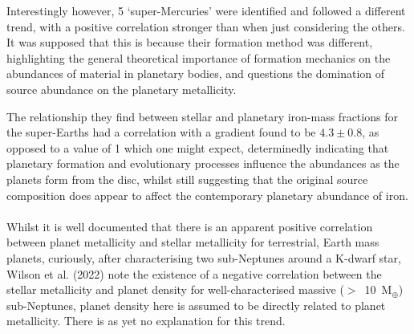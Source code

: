 \documentclass[a4paper,twocolumn,12pt]{article}
\begin{document}
Interestingly however, 
5 `super-Mercuries' were identified and followed a different trend, with a positive correlation stronger than when just considering the others. It was supposed that this is because their formation method was different, highlighting the general theoretical importance of formation mechanics on the abundances of material in planetary bodies, and questions the domination of source abundance on the planetary metallicity.

The relationship they find between stellar and planetary iron-mass fractions for the super-Earths had a correlation with a gradient found to be $4.3\pm0.8$, as opposed to a value of 1 which one might expect, determinedly indicating that planetary formation and evolutionary processes influence the abundances as the planets form from the disc, whilst still suggesting that the original source composition does appear to affect the contemporary planetary abundance of iron.
%
%
% 
% 
% 
\\\\Whilst it is well documented that there is an apparent positive correlation between planet metallicity and stellar metallicity for terrestrial, Earth mass planets, curiously, after characterising two sub-Neptunes around a K-dwarf star, Wilson et al. (2022) \cite{Wilson} note the existence of a negative correlation between the stellar metallicity and planet density for well-characterised massive ($>$~10~M$_{\oplus}$) sub-Neptunes, planet density here is assumed to be directly related to planet metallicity. There is as yet no explanation for this trend.




\end{document}
